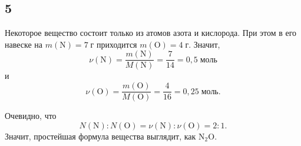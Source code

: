 \subsection{5}

Некоторое вещество состоит только из атомов азота и кислорода. При этом в его навеске на $m(\mathrm{N})=7\;\text{г}$ приходится $m(\mathrm{O})=4\;\text{г}$. Значит,
\[
\nu(\mathrm{N})=\frac{m(\mathrm{N})}{M(\mathrm{N})}=\frac{7}{14}=0{,}5\;\text{моль}
\]
и
\[
\nu(\mathrm{O})=\frac{m(\mathrm{O})}{M(\mathrm{O})}=\frac{4}{16}=0{,}25\;\text{моль}.
\]

Очевидно, что
\[
N(\mathrm{N}):N(\mathrm{O})=\nu(\mathrm{N}):\nu(\mathrm{O})=2:1.
\]
Значит, простейшая формула вещества выглядит, как $\mathrm{N_2O}$.